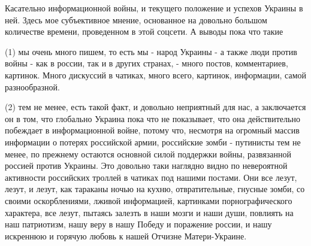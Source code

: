 Касательно информационной войны, и текущего положение и успехов Украины в ней.
Здесь мое субъективное мнение, основанное на довольно большом количестве
времени, проведенном в этой соцсети. А выводы пока что такие

(1) мы очень много пишем, то есть мы - народ Украины - а также люди против
войны - как в россии, так и в других странах, - много постов, комментариев,
картинок. Много дискуссий в чатиках, много всего, картинок, информации, самой
разнообразной.

(2) тем не менее, есть такой факт, и довольно неприятный для нас, а заключается
он в том, что глобально Украина пока что не показывает, что она действительно
побеждает в информационной войне, потому что, несмотря на огромный массив
информации о потерях российской армии, российские зомби - путинисты тем не
менее, по прежнему остаются основной силой поддержки войны, развязанной россией
против Украины. Это довольно таки наглядно видно по невероятной активности
российских троллей в чатиках под нашими постами. Они все лезут, лезут, и лезут,
как тараканы ночью на кухню, отвратительные, гнусные зомби, со своими
оскорблениями, лживой информацией, картинками порнографического характера, все
лезут, пытаясь залезть в наши мозги и наши души, повлиять на наш патриотизм,
нашу веру в нашу Победу и поражение россии, и нашу искреннюю и горячую любовь к
нашей Отчизне Матери-Украине.
